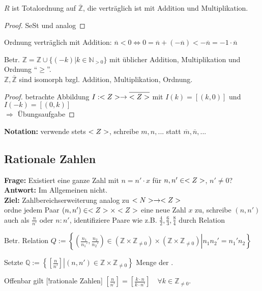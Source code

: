 \begin{proposition}
	$R$ ist Totalordnung auf $\overline{\mathbb{Z}}$, die verträglich ist mit Addition und Multiplikation.
\end{proposition}
\begin{proof}
	SeSt und analog
\end{proof}

Ordnung verträglich mit Addition: $\overline{n}<0\iff 0=\overline{n}+(-\overline{n})< -\overline{n}=-1\cdot \overline{n}$

\begin{proposition}
	Betr. $\mathbb{Z} = \mathbb{Z}\cup\{ (-k) | k\in\mathbb{N}_{>0} \}$ mit üblicher Addition, Multiplikation und Ordnung "`$\ge$"'. \\
	$\mathbb{Z},\overline{\mathbb{Z}}$ sind isomorph bzgl. Addition, Multiplikation, Ordnung.
\end{proposition}
\begin{proof}
	betrachte Abbildung $I:\whole\to\overline{\whole}$ mit $I(k)=[(k,0)]$ und $I(-k)=[(0,k)]$ \\
	$\Rightarrow$ Übungsaufgabe
\end{proof}

\textbf{Notation:} verwende stets $<Z>$, schreibe $m,n,...$ statt $\overline{m},\overline{n},...$

\subsection{Rationale Zahlen}

\textbf{Frage:} Existiert eine ganze Zahl mit $n=n'\cdot x$ für $n,n'\in<Z>$, $n'\neq 0$? \\
\textbf{Antwort:} Im Allgemeinen nicht. \\
\textbf{Ziel:} Zahlbereichserweiterung analog zu $<N>\to<Z>$ \\
ordne jedem Paar $(n,n')\in<Z>\times<Z>$ eine neue Zahl $x$ zu, schreibe $(n,n')$ auch als 
$\frac{n}{n'}$ oder $n:n'$, identifiziere Paare wie z.B. $\frac{4}{2},\frac{6}{3},\frac{8}{4}$ durch Relation

\begin{*definition}
	Betr. Relation $Q:=\left\lbrace \left. \left( \frac{n_1}{n_1'},\frac{n_2}{n_2'}\right) \in \left( \mathbb{Z}\times\mathbb{Z}_{\neq 0}\right)\times\left(\mathbb{Z}\times\mathbb{Z}_{\neq 0}\right) \right| n_1n_2' = n_1'n_2\right\rbrace$
	
	Setzte $\mathbb{Q} := \left\lbrace \left[ \left. \frac{n}{n'}\right] \right| (n,n')\in\mathbb{Z}\times\mathbb{Z}_{\neq 0}\right\rbrace$ Menge der .
	
	Offenbar gilt [!rationale Zahlen] $\left[ \frac{n}{n'}\right] = \left[ \frac{k\cdot n}{k\cdot n'}\right]\quad\forall k\in\mathbb{Z}_{\neq 0}$.
\end{*definition}

